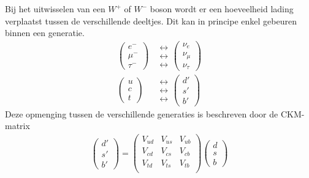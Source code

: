 \documentclass[../main.tex]{subfiles}
\begin{document}
Bij het uitwisselen van een $W^+$ of $W^-$ boson wordt er een hoeveelheid lading verplaatst tussen de verschillende deeltjes. Dit kan in principe enkel gebeuren binnen een generatie.
\begin{equation}
    \begin{aligned}
        \label{eq:zwak_gen}
        \begin{pmatrix}
            e^-\\
            \mu^-\\
            \tau^-
        \end{pmatrix}
        &\begin{matrix}
            \leftrightarrow\\
            \leftrightarrow\\
            \leftrightarrow
        \end{matrix}
        \begin{pmatrix}
            \nu_e\\
            \nu_\mu\\
            \nu_\tau
        \end{pmatrix}\\
    \begin{pmatrix}
            u\\
            c\\
            t
        \end{pmatrix}
        &\begin{matrix}
            \leftrightarrow\\
            \leftrightarrow\\
            \leftrightarrow
        \end{matrix}
        \begin{pmatrix}
            d'\\
            s'\\
            b'
        \end{pmatrix}
    \end{aligned}
\end{equation}
Deze opmenging tussen de verschillende generaties is beschreven door de CKM-matrix
\begin{equation}
    \begin{aligned}
        \label{eq:ckm_matrix}
        \begin{pmatrix}
            d'\\
            s'\\
            b'
        \end{pmatrix}
        =
        \begin{pmatrix}
            V_{ud} & V_{us} & V_{ub} \\
            V_{cd} & V_{cs} & V_{cb} \\
            V_{td} & V_{ts} & V_{tb} \\
        \end{pmatrix}
        \begin{pmatrix}
            d\\
            s\\
            b
        \end{pmatrix}
    \end{aligned}
\end{equation}
\end{document}
